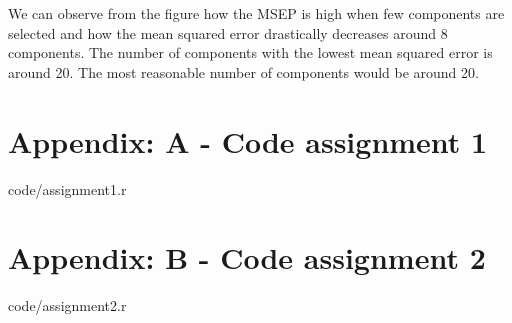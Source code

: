 \documentclass[a4paper,12pt]{article}
\begin{document}
    We can observe from the figure how the MSEP is high when few components are selected and how the mean squared error drastically decreases around 8 components. The number of components with the lowest mean squared error is around 20. The most reasonable number of components would be around 20.
    \newpage
    \section{Appendix: A - Code assignment 1}

    
    {code/assignment1.r}

    \section{Appendix: B - Code assignment 2}

    
    {code/assignment2.r}

    
\end{document}
